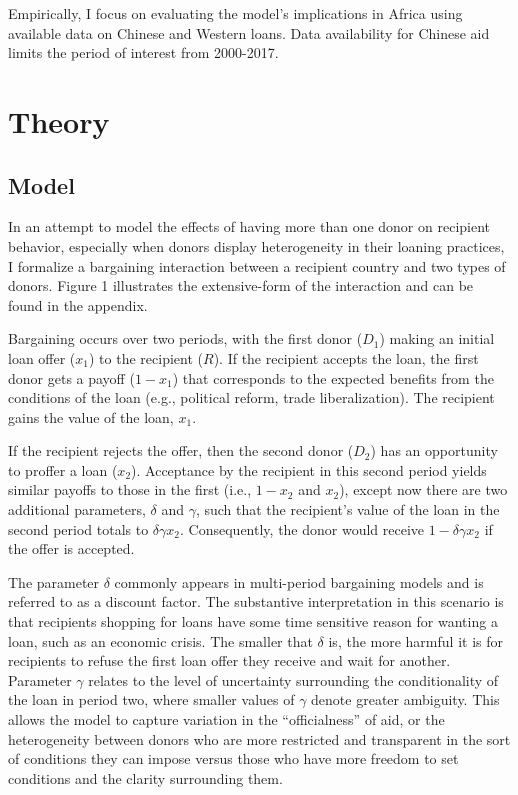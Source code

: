 \documentclass{article}
\begin{document}
Empirically, I focus on evaluating the model's implications in Africa using available data on Chinese and Western loans. Data availability for Chinese aid limits the period of interest from 2000-2017.

\section*{Theory}
\subsection*{Model}
In an attempt to model the effects of having more than one donor on recipient behavior, especially when donors display heterogeneity in their loaning practices, I formalize a bargaining interaction between a recipient country and two types of donors. Figure 1 illustrates the extensive-form of the interaction and can be found in the appendix.  

Bargaining occurs over two periods, with the first donor ($D_1$) making an initial loan offer ($x_1$) to the recipient ($R$). If the recipient accepts the loan, the first donor gets a payoff ($1-x_1$) that corresponds to the expected benefits from the conditions of the loan (e.g., political reform, trade liberalization). The recipient gains the value of the loan, $x_1$.

If the recipient rejects the offer, then the second donor ($D_2$) has an opportunity to proffer a loan ($x_2$). Acceptance by the recipient in this second period yields similar payoffs to those in the first (i.e., $1-x_2$ and $x_2$), except now there are two additional parameters, $\delta$ and $\gamma$, such that the recipient's value of the loan in the second period totals to $\delta \gamma x_2$. Consequently, the donor would receive $1-\delta \gamma x_2$ if the offer is accepted.

The parameter $\delta$ commonly appears in multi-period bargaining models and is referred to as a discount factor. The substantive interpretation in this scenario is that recipients shopping for loans have some time sensitive reason for wanting a loan, such as an economic crisis. The smaller that $\delta$ is, the more harmful it is for recipients to refuse the first loan offer they receive and wait for another. Parameter $\gamma$ relates to the level of uncertainty surrounding the conditionality of the loan in period two, where smaller values of $\gamma$ denote greater ambiguity. This allows the model to capture variation in the ``officialness'' of aid, or the heterogeneity between donors who are more restricted and transparent in the sort of conditions they can impose versus those who have more freedom to set conditions and the clarity surrounding them.
\end{document}
